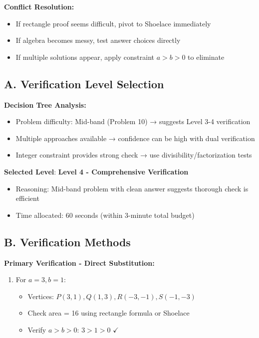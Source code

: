\documentclass[]{article}
\begin{document}
\begin{techniquesbox}
\textbf{Conflict Resolution:}
\begin{itemize}[leftmargin=*]
    \item If rectangle proof seems difficult, pivot to Shoelace immediately
    \item If algebra becomes messy, test answer choices directly
    \item If multiple solutions appear, apply constraint $a > b > 0$ to eliminate
\end{itemize}
\end{techniquesbox}

\begin{verificationbox}
\subsection*{A. Verification Level Selection}

\textbf{Decision Tree Analysis:}
\begin{itemize}[leftmargin=*]
    \item Problem difficulty: Mid-band (Problem 10) → suggests Level 3-4 verification
    \item Multiple approaches available → confidence can be high with dual verification
    \item Integer constraint provides strong check → use divisibility/factorization tests
\end{itemize}

\textbf{Selected Level}: \textbf{Level 4 - Comprehensive Verification}
\begin{itemize}[leftmargin=*]
    \item Reasoning: Mid-band problem with clean answer suggests thorough check is efficient
    \item Time allocated: 60 seconds (within 3-minute total budget)
\end{itemize}

\subsection*{B. Verification Methods}

\textbf{Primary Verification - Direct Substitution:}
\begin{enumerate}
    \item For $a=3, b=1$:
    \begin{itemize}
        \item Vertices: $P(3,1), Q(1,3), R(-3,-1), S(-1,-3)$
        \item Check area = 16 using rectangle formula or Shoelace
        \item Verify $a > b > 0$: $3 > 1 > 0$ $\checkmark$
    \end{itemize}
\end{enumerate}


\end{verificationbox}
\end{document}
